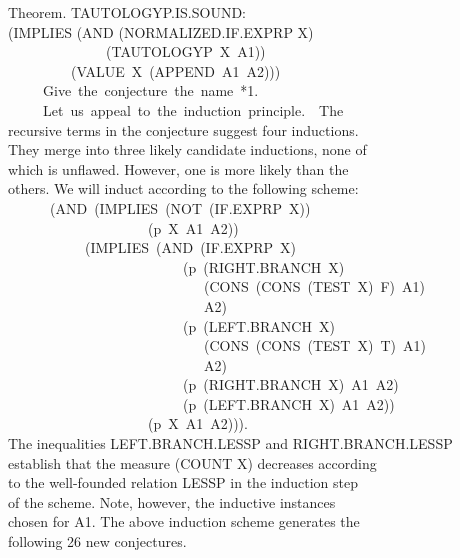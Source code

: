 \documentclass[10pt]{book}
\newenvironment{pubasis}{\begin{flushleft}}{\end{flushleft}}
\begin{document}
\begin{pubasis}
Theorem.  TAUTOLOGYP.IS.SOUND:\\
(IMPLIES (AND (NORMALIZED.IF.EXPRP X)\\
~~~~~~~~~~~~~~(TAUTOLOGYP~X~A1))\\
~~~~~~~~~(VALUE~X~(APPEND~A1~A2)))\\

~~~~~Give~the~conjecture~the~name~*1.\\

~~~~~Let~us~appeal~to~the~induction~principle.~~The\\
recursive terms in the conjecture suggest four inductions.\\
They merge into three likely candidate inductions, none of\\
which is unflawed.  However, one is more likely than the\\
others.  We will induct according to the following scheme:\\
~~~~~~(AND~(IMPLIES~(NOT~(IF.EXPRP~X))\\
~~~~~~~~~~~~~~~~~~~~(p~X~A1~A2))\\
~~~~~~~~~~~(IMPLIES~(AND~(IF.EXPRP~X)\\
~~~~~~~~~~~~~~~~~~~~~~~~~(p~(RIGHT.BRANCH~X)\\
~~~~~~~~~~~~~~~~~~~~~~~~~~~~(CONS~(CONS~(TEST~X)~F)~A1)\\
~~~~~~~~~~~~~~~~~~~~~~~~~~~~A2)\\
~~~~~~~~~~~~~~~~~~~~~~~~~(p~(LEFT.BRANCH~X)\\
~~~~~~~~~~~~~~~~~~~~~~~~~~~~(CONS~(CONS~(TEST~X)~T)~A1)\\
~~~~~~~~~~~~~~~~~~~~~~~~~~~~A2)\\
~~~~~~~~~~~~~~~~~~~~~~~~~(p~(RIGHT.BRANCH~X)~A1~A2)\\
~~~~~~~~~~~~~~~~~~~~~~~~~(p~(LEFT.BRANCH~X)~A1~A2))\\
~~~~~~~~~~~~~~~~~~~~(p~X~A1~A2))).\\
The inequalities LEFT.BRANCH.LESSP and RIGHT.BRANCH.LESSP\\
establish that the measure (COUNT X) decreases according\\
to the well-founded relation LESSP in the induction step\\
of the scheme.  Note, however, the inductive instances\\
chosen for A1.  The above induction scheme generates the\\
following 26 new conjectures.\\
\end{pubasis}
\end{document}
